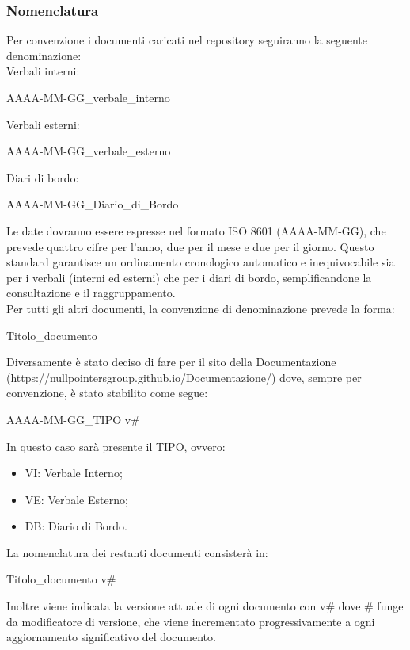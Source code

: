\subsubsection{Nomenclatura}
Per convenzione i documenti caricati nel repository seguiranno la seguente denominazione:\\
Verbali interni:
\begin{center}
    AAAA-MM-GG\_verbale\_interno
\end{center}
Verbali esterni:
\begin{center}
    AAAA-MM-GG\_verbale\_esterno
\end{center}
Diari di bordo:
\begin{center}
    AAAA-MM-GG\_Diario\_di\_Bordo
\end{center}
Le date dovranno essere espresse nel formato ISO 8601 (AAAA-MM-GG), che prevede quattro cifre per l'anno, due per il mese e due per il giorno. Questo standard garantisce un ordinamento cronologico automatico e inequivocabile sia per i verbali (interni ed esterni) che per i diari di bordo, semplificandone la consultazione e il raggruppamento.\\
Per tutti gli altri documenti, la convenzione di denominazione prevede la forma:
\begin{center}
    Titolo\_documento
\end{center}
Diversamente è stato deciso di fare per il sito della Documentazione \\
(https://nullpointersgroup.github.io/Documentazione/) dove, sempre per convenzione, è stato stabilito come segue:
\begin{center}
    AAAA-MM-GG\_TIPO v\#
\end{center}
In questo caso sarà presente il TIPO, ovvero:
\begin{itemize}[itemsep=5pt, parsep=1pt, label=$\scriptstyle\bullet$]
    \item VI: Verbale Interno;
    \item VE: Verbale Esterno;
    \item DB: Diario di Bordo.
\end{itemize}
La nomenclatura dei restanti documenti consisterà in:
\begin{center}
    Titolo\_documento v\#
\end{center}
Inoltre viene indicata la versione attuale di ogni documento con v\# dove \# funge da modificatore di versione, che viene incrementato progressivamente a ogni aggiornamento significativo del documento.

